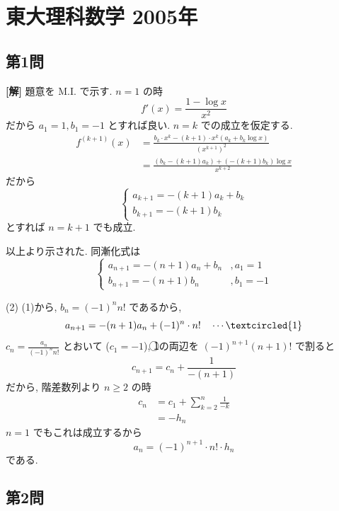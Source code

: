 \documentclass[../main.tex]{subfiles}
\begin{document}
\section*{東大理科数学 2005年}

\subsection*{第1問}

\noindent
\textbf{[解]} 題意を M.I. で示す. $n=1$ の時
\[
  f'(x) = \frac{1 - \log x}{x^2}
\]
だから $a_1 = 1, b_1 = -1$ とすれば良い. $n=k$ での成立を仮定する.
\begin{align*}
  f^{(k+1)}(x) &= \frac{b_k \cdot x^k - (k+1) \cdot x^k (a_k + b_k \log x)}{(x^{k+1})^2} \\
  &= \frac{(b_k - (k+1) a_k) + (-(k+1) b_k) \log x}{x^{k+2}}
\end{align*}
だから
\[
  \begin{cases}
    a_{k+1} = -(k+1) a_k + b_k \\
    b_{k+1} = -(k+1) b_k
  \end{cases}
\]
とすれば $n=k+1$ でも成立.

\bigskip

\noindent
以上より示された. 同漸化式は
\[
  \begin{cases}
    a_{n+1} = -(n+1) a_n + b_n &, a_1 = 1 \\
    b_{n+1} = -(n+1) b_n &, b_1 = -1
  \end{cases}
\]

\bigskip

\noindent
(2) (1)から, $b_n = (-1)^n n!$ であるから,
\[
  a_{n+1} = -(n+1) a_n + (-1)^n \cdot n! \quad \cdots \textcircled{1}
\]
$c_n = \frac{a_n}{(-1)^n n!}$ とおいて ($c_1 = -1$), \textcircled{1}の両辺を $(-1)^{n+1} (n+1)!$ で割ると
\[
  c_{n+1} = c_n + \frac{1}{-(n+1)}
\]
だから, 階差数列より $n \ge 2$ の時
\begin{align*}
  c_n &= c_1 + \sum_{k=2}^n \frac{1}{-k} \\
  &= -h_n
\end{align*}
$n=1$ でもこれは成立するから
\[
  a_n = (-1)^{n+1} \cdot n! \cdot h_n
\]
である.

\newpage

\subsection*{第2問}
\end{document}
